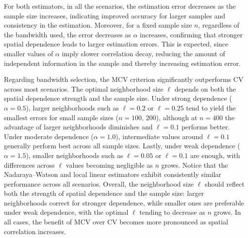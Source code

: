 \documentclass[12pt]{report} %
\begin{document}
For both estimators, in all the scenarios, the estimation error decreases as the sample size increases, indicating improved accuracy for larger samples and consistency in the estimation. Moreover, for a fixed sample size $n$, regardless of the bandwidth used, the error decreases as $\alpha$ increases, confirming that stronger spatial dependence leads to larger estimation errors. This is expected, since smaller values of $\alpha$ imply slower correlation decay, reducing the amount of independent information in the sample and thereby increasing estimation error. 
 

Regarding bandwidth selection, the MCV criterion significantly outperforms CV across most scenarios. The optimal neighborhood size $\ell$ depends on both the spatial dependence strength and the sample size. Under strong dependence ($\alpha=0.5$), larger neighborhoods such as $\ell=0.2$ or $\ell=0.25$ tend to yield the smallest errors for small sample sizes ($n=100$, $200$), 
although at $n=400$ the advantage of larger neighborhoods diminishes and $\ell=0.1$ performs better.
Under moderate dependence ($\alpha=1.0$), intermediate values around $\ell=0.1$ generally perform best across all sample sizes. Lastly, under weak dependence ($\alpha=1.5$), smaller neighborhoods such as $\ell=0.05$ or $\ell=0.1$ are enough, with differences across $\ell$ values becoming negligible as $n$ grows. Notice that the Nadaraya--Watson and local linear estimators exhibit consistently similar performance across all scenarios. Overall, the neighborhood size $\ell$ should reflect both the strength of spatial dependence and the sample size: larger neighborhoods correct for stronger dependence, while smaller ones are preferable under weak dependence, with the optimal $\ell$ tending to decrease as $n$ grows. In all cases, the benefit of MCV over CV becomes more pronounced as spatial correlation increases.



\end{document}
